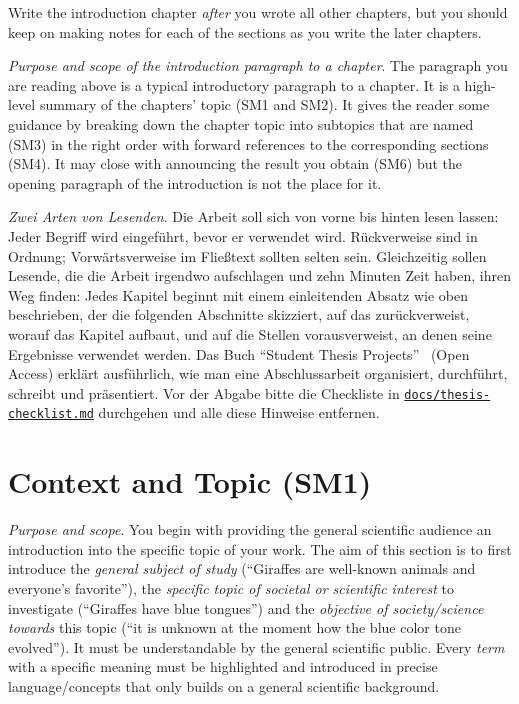 Write the introduction chapter \emph{after} you wrote all other chapters, but you should keep on making notes for each of the sections as you write the later chapters.

\emph{Purpose and scope of the introduction paragraph to a chapter}.
The paragraph you are reading above is a typical introductory paragraph to a chapter.
It is a high-level summary of the chapters' topic (SM1 and SM2).
It gives the reader some guidance by breaking down the chapter topic into subtopics that are named (SM3) in the right order with forward references to the corresponding sections (SM4).
It may close with announcing the result you obtain (SM6) but the opening paragraph of the introduction is not the place for it.

\emph{Zwei Arten von Lesenden}.
Die Arbeit soll sich von vorne bis hinten lesen lassen: Jeder Begriff wird eingeführt, bevor er verwendet wird.
Rückverweise sind in Ordnung; Vorwärtsverweise im Fließtext sollten selten sein.
Gleichzeitig sollen Lesende, die die Arbeit irgendwo aufschlagen und zehn Minuten Zeit haben, ihren Weg finden:
Jedes Kapitel beginnt mit einem einleitenden Absatz wie oben beschrieben, der die folgenden Abschnitte skizziert, auf das zurückverweist, worauf das Kapitel aufbaut, und auf die Stellen vorausverweist, an denen seine Ergebnisse verwendet werden.
Das Buch \enquote{Student Thesis Projects}~\cite{Lichter2026} (Open Access) erklärt ausführlich, wie man eine Abschlussarbeit organisiert, durchführt, schreibt und präsentiert.
Vor der Abgabe bitte die Checkliste in \href{https://github.com/latextemplates/scientific-thesis-template/blob/main/docs/thesis-checklist.md}{\texttt{docs/thesis-checklist.md}} durchgehen und alle diese Hinweise entfernen.

\section{Context and Topic (SM1)}\label{sec:introduction:topic}

\emph{Purpose and scope}.
You begin with providing the general scientific audience an introduction into the specific topic of your work.
The aim of this section is to first introduce the \emph{general subject of study} (``Giraffes are well-known animals and everyone's favorite''), the \emph{specific topic of societal or scientific interest} to investigate (``Giraffes have blue tongues'') and the \emph{objective of society/science towards} this topic (``it is unknown at the moment how the blue color tone evolved'').
It must be understandable by the general scientific public.
Every \emph{term} with a specific meaning must be highlighted and introduced in precise language/concepts that only builds on a general scientific background.

